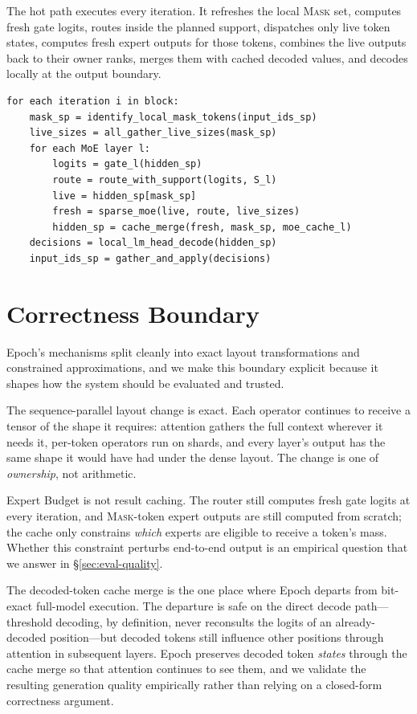 \documentclass[sigconf,review,anonymous, 10pt]{acmart}
\newcommand{\sys}{Epoch}
\newcommand{\mask}{\textsc{Mask}}
\begin{document}
The hot path executes every iteration.
It refreshes the local \mask{} set, computes fresh gate logits, routes inside the planned support, dispatches only live token states, computes fresh expert outputs for those tokens, combines the live outputs back to their owner ranks, merges them with cached decoded values, and decodes locally at the output boundary.

\begin{lstlisting}[caption={Hot path for one block iteration.},label={lst:hotpath}]
for each iteration i in block:
    mask_sp = identify_local_mask_tokens(input_ids_sp)
    live_sizes = all_gather_live_sizes(mask_sp)
    for each MoE layer l:
        logits = gate_l(hidden_sp)
        route = route_with_support(logits, S_l)
        live = hidden_sp[mask_sp]
        fresh = sparse_moe(live, route, live_sizes)
        hidden_sp = cache_merge(fresh, mask_sp, moe_cache_l)
    decisions = local_lm_head_decode(hidden_sp)
    input_ids_sp = gather_and_apply(decisions)
\end{lstlisting}

\section{Correctness Boundary}

\sys{}'s mechanisms split cleanly into exact layout transformations and constrained approximations, and we make this boundary explicit because it shapes how the system should be evaluated and trusted.

The sequence-parallel layout change is exact.
Each operator continues to receive a tensor of the shape it requires: attention gathers the full context wherever it needs it, per-token operators run on shards, and every layer's output has the same shape it would have had under the dense layout.
The change is one of \emph{ownership}, not arithmetic.

Expert Budget is not result caching.
The router still computes fresh gate logits at every iteration, and \mask{}-token expert outputs are still computed from scratch; the cache only constrains \emph{which} experts are eligible to receive a token's mass.
Whether this constraint perturbs end-to-end output is an empirical question that we answer in \S\ref{sec:eval-quality}.

The decoded-token cache merge is the one place where \sys{} departs from bit-exact full-model execution.
The departure is safe on the direct decode path---threshold decoding, by definition, never reconsults the logits of an already-decoded position---but decoded tokens still influence other positions through attention in subsequent layers.
\sys{} preserves decoded token \emph{states} through the cache merge so that attention continues to see them, and we validate the resulting generation quality empirically rather than relying on a closed-form correctness argument.
\end{document}
